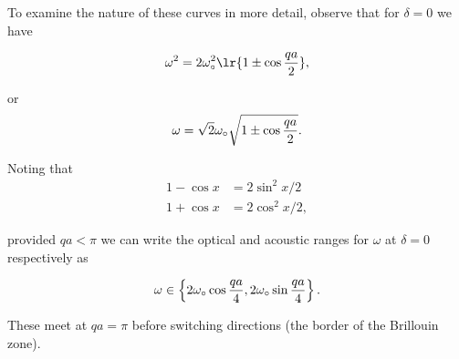 {To examine the nature of these curves in more detail, observe that for \(\delta = 0\) we have

\begin{dmath}\label{eqn:condensedMatterProblemSet4Problem2:820}
\omega^2 = 2 \omega_\nought^2 \lr{ 1 \pm \cos \frac{qa}{2} },
\end{dmath}

or
\begin{dmath}\label{eqn:condensedMatterProblemSet4Problem2:840}
\omega = \sqrt{2} \omega_\nought \sqrt{ 1 \pm \cos \frac{qa}{2} }.
\end{dmath}

Noting that 
\begin{equation}\label{eqn:condensedMatterProblemSet4Problem2:860}
\begin{aligned}
1 - \cos x &= 2 \sin^2 x/2 \\
1 + \cos x &= 2 \cos^2 x/2,
\end{aligned}
\end{equation}

provided \(qa < \pi\) we can write the optical and acoustic ranges for \(\omega\) at \(\delta = 0\) respectively as

\begin{dmath}\label{eqn:condensedMatterProblemSet4Problem2:880}
\omega \in \left\{ 
2 \omega_\nought \cos \frac{qa}{4},
2 \omega_\nought \sin \frac{qa}{4}
 \right\}.
\end{dmath}

These meet at \(qa = \pi\) before switching directions (the border of the Brillouin zone).
}
